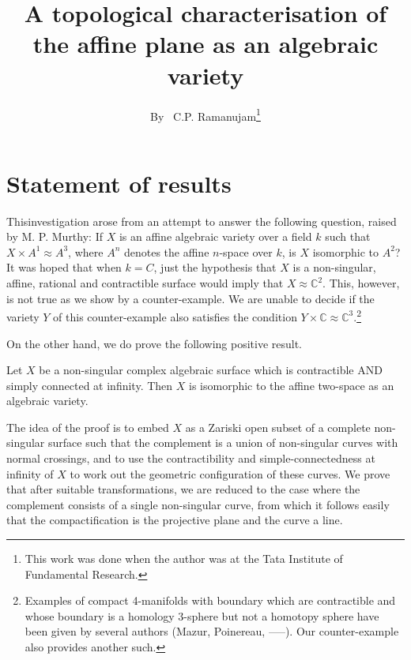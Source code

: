 \title{A topological characterisation of the affine plane as an algebraic variety}\label{art8}

\author{By~ C.P. Ramanujam\footnote{This work was done when the author was at the Tata Institute of Fundamental Research.}}

\date{}
\maketitle

\setcounter{page}{97}

\section{Statement of results}\label{art8-sec1}%

\setcounter{pageoriginal}{74}
This\pageoriginale  investigation arose from an attempt to answer the following question, raised by M. P. Murthy: If $X$ is an affine algebraic variety over a field $k$ such that $X \times A^1 \approx A^3$, where $A^n$ denotes the affine $n$-space over $k$, is $X$ isomorphic to $A^2$? It was hoped that when $k=C$, just the hypothesis that $X$ is a non-singular, affine, rational and contractible surface would imply that $X \approx \mathbb{C}^2$. This, however, is not true as we show by a counter-example. We are unable to decide if the variety $Y$ of this counter-example also satisfies the condition $Y \times \mathbb{C} \approx \mathbb{C}^3$.\footnote{Examples of compact 4-manifolds with boundary which are contractible and whose boundary is a homology 3-sphere but not a homotopy sphere have been given by several authors (Mazur, Poinereau, -----). Our counter-example also provides another such.}

On the other hand, we do prove the following positive result.

\begin{theorem*}
Let $X$ be a non-singular complex algebraic surface which is contractible AND simply connected at infinity. Then $X$ is isomorphic to the affine two-space as an algebraic variety.
\end{theorem*}

The idea of the proof is to embed $X$ as a Zariski open subset of a complete non-singular surface such that the complement is a union of non-singular curves with normal crossings, and to use the contractibility and simple-connectedness at infinity of $X$ to work out the geometric configuration of these curves. We prove that after suitable transformations, we are reduced to the case where the complement consists of a single non-singular curve, from which it follows easily that the compactification is the projective plane and the curve a line.

